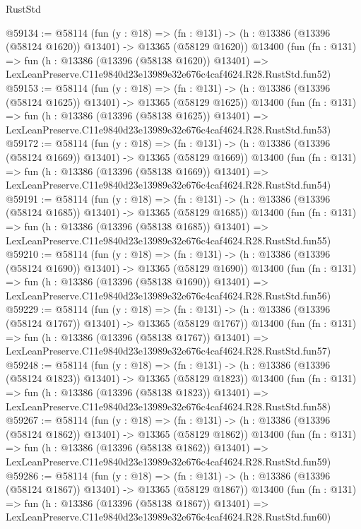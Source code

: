 \begin{lexlean}{RustStd}
\begin{coremodule}
@59134 := @58114
    (fun (y : @18) =>
    (fn : @131) -> (h : @13386 (@13396 (@58124 @1620)) @13401) -> @13365 (@58129 @1620))
    @13400
    (fun (fn : @131) =>
    fun (h : @13386 (@13396 (@58138 @1620)) @13401) =>
    LexLeanPreserve.C11e9840d23e13989e32e676c4caf4624.R28.RustStd.fun52)
@59153 := @58114
    (fun (y : @18) =>
    (fn : @131) -> (h : @13386 (@13396 (@58124 @1625)) @13401) -> @13365 (@58129 @1625))
    @13400
    (fun (fn : @131) =>
    fun (h : @13386 (@13396 (@58138 @1625)) @13401) =>
    LexLeanPreserve.C11e9840d23e13989e32e676c4caf4624.R28.RustStd.fun53)
@59172 := @58114
    (fun (y : @18) =>
    (fn : @131) -> (h : @13386 (@13396 (@58124 @1669)) @13401) -> @13365 (@58129 @1669))
    @13400
    (fun (fn : @131) =>
    fun (h : @13386 (@13396 (@58138 @1669)) @13401) =>
    LexLeanPreserve.C11e9840d23e13989e32e676c4caf4624.R28.RustStd.fun54)
@59191 := @58114
    (fun (y : @18) =>
    (fn : @131) -> (h : @13386 (@13396 (@58124 @1685)) @13401) -> @13365 (@58129 @1685))
    @13400
    (fun (fn : @131) =>
    fun (h : @13386 (@13396 (@58138 @1685)) @13401) =>
    LexLeanPreserve.C11e9840d23e13989e32e676c4caf4624.R28.RustStd.fun55)
@59210 := @58114
    (fun (y : @18) =>
    (fn : @131) -> (h : @13386 (@13396 (@58124 @1690)) @13401) -> @13365 (@58129 @1690))
    @13400
    (fun (fn : @131) =>
    fun (h : @13386 (@13396 (@58138 @1690)) @13401) =>
    LexLeanPreserve.C11e9840d23e13989e32e676c4caf4624.R28.RustStd.fun56)
@59229 := @58114
    (fun (y : @18) =>
    (fn : @131) -> (h : @13386 (@13396 (@58124 @1767)) @13401) -> @13365 (@58129 @1767))
    @13400
    (fun (fn : @131) =>
    fun (h : @13386 (@13396 (@58138 @1767)) @13401) =>
    LexLeanPreserve.C11e9840d23e13989e32e676c4caf4624.R28.RustStd.fun57)
@59248 := @58114
    (fun (y : @18) =>
    (fn : @131) -> (h : @13386 (@13396 (@58124 @1823)) @13401) -> @13365 (@58129 @1823))
    @13400
    (fun (fn : @131) =>
    fun (h : @13386 (@13396 (@58138 @1823)) @13401) =>
    LexLeanPreserve.C11e9840d23e13989e32e676c4caf4624.R28.RustStd.fun58)
@59267 := @58114
    (fun (y : @18) =>
    (fn : @131) -> (h : @13386 (@13396 (@58124 @1862)) @13401) -> @13365 (@58129 @1862))
    @13400
    (fun (fn : @131) =>
    fun (h : @13386 (@13396 (@58138 @1862)) @13401) =>
    LexLeanPreserve.C11e9840d23e13989e32e676c4caf4624.R28.RustStd.fun59)
@59286 := @58114
    (fun (y : @18) =>
    (fn : @131) -> (h : @13386 (@13396 (@58124 @1867)) @13401) -> @13365 (@58129 @1867))
    @13400
    (fun (fn : @131) =>
    fun (h : @13386 (@13396 (@58138 @1867)) @13401) =>
    LexLeanPreserve.C11e9840d23e13989e32e676c4caf4624.R28.RustStd.fun60)

\end{coremodule}
\end{lexlean}
